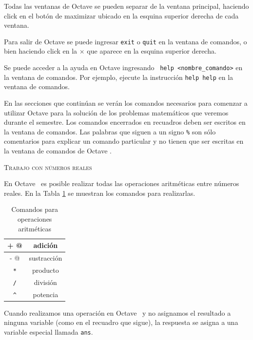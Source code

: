 \documentclass[letter,11pt]{article}
\newcommand\0{\mathbf{0}}
\newcommand{\octave}{{\sc Octave }}
\begin{document}
Todas las ventanas de \octave se pueden separar  de la ventana principal, haciendo click en el bot\'on de maximizar ubicado en la esquina superior derecha de cada ventana.

Para salir de \octave se puede ingresar \verb+exit+ o \verb+quit+ en la ventana de comandos, o bien haciendo click en la $\times$ que aparece en la esquina superior derecha.

Se puede acceder a la ayuda  en \octave{} ingresando \ \verb+help <nombre_comando>+ en la ventana de comandos. Por ejemplo, ejecute la instrucci\'on \verb"help help" en la ventana de comandos.

En las secciones que contin\'uan se ver\'an los comandos necesarios para comenzar a utilizar \octave
para la soluci\'on de los problemas matem\'aticos que veremos durante el semestre.
Los comandos encerrados en recuadros deben ser escritos en la ventana de comandos.
Las palabras que siguen a un signo \texttt{\%} son s\'olo comentarios
para explicar un comando particular y no tienen que ser escritas en la ventana de comandos de \octave.

\bigskip
\centerline{\textsc{Trabajo con n\'umeros reales}}
\medskip

	En \octave\, es posible realizar todas las operaciones aritm\'eticas entre n\'umeros reales.
	En la Tabla \ref{table:operaciones} se muestran los comandos para realizarlas.

	\begin{table}[ht]
\begin{center}
		\begin{tabular}{|c|c|}\hline
			\verb@ + @ & adici\'on\\\hline
			\verb@ - @ & sustracci\'on\\\hline
			\verb+ * + & producto\\\hline
			\verb+ / + & divisi\'on\\\hline
			\verb+ ^ + & potencia\\\hline
		\end{tabular}
\end{center}
		\caption{Comandos para operaciones aritm\'eticas}\label{table:operaciones}
	\end{table}

	Cuando realizamos una operaci\'on en \octave\, y no asignamos el resultado a ninguna variable (como en el recuadro que sigue), la respuesta se asigna a una variable especial llamada \verb+ans+.

	\medskip
	
\end{document}

